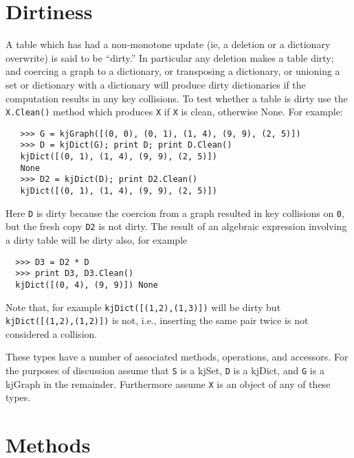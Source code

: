 \section{Dirtiness}

A table which has had a non-monotone update (ie, a deletion
or a dictionary overwrite) is said to be ``dirty.''  In particular
any deletion makes a table dirty; and coercing a graph to a dictionary,
or transposing a dictionary, or unioning a set or dictionary with
a dictionary will produce dirty dictionaries if the
computation results in any key
collisions.  To test whether a table is dirty use the {\tt X.Clean()}
method which produces {\tt X} if {\tt X} is clean, otherwise None.
For example:
\begin{verbatim}
   >>> G = kjGraph([(0, 0), (0, 1), (1, 4), (9, 9), (2, 5)])
   >>> D = kjDict(G); print D; print D.Clean()
   kjDict([(0, 1), (1, 4), (9, 9), (2, 5)])
   None
   >>> D2 = kjDict(D); print D2.Clean()
   kjDict([(0, 1), (1, 4), (9, 9), (2, 5)])
\end{verbatim}
Here {\tt D} is dirty because the coercion from a graph resulted in
key collisions on {\tt 0}, but the fresh copy {\tt D2} is not dirty.
The result of an algebraic expression involving a dirty
table will be dirty also, for example
\begin{verbatim}
  >>> D3 = D2 * D
  >>> print D3, D3.Clean()
  kjDict([(0, 4), (9, 9)]) None
\end{verbatim}
Note that, for example {\tt kjDict([(1,2),(1,3)])} will be dirty
but {\tt kjDict([(1,2),(1,2)])} is not, i.e., inserting the
same pair twice is not considered a collision.

These types have a number of associated methods, operations, and accessors.
For the purposes of discussion assume that {\tt S} is a kjSet,
{\tt D} is a kjDict, and {\tt G} is a kjGraph in the remainder.  
Furthermore assume {\tt X} is an object of
any of these types.

\section{Methods}

